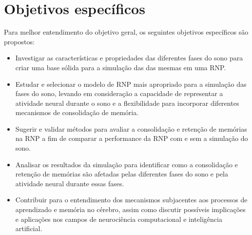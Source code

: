 \section{Objetivos específicos}

Para melhor entendimento do objetivo geral, os seguintes objetivos específicos são propostos:

\begin{itemize}

  \item Investigar as características e propriedades das diferentes fases do sono para criar uma base sólida para a simulação das
das mesmas em uma RNP.\@

  \item Estudar e selecionar o modelo de RNP mais apropriado para a simulação das fases do sono, levando em consideração a
capacidade de representar a atividade neural durante o sono e a flexibilidade para incorporar diferentes mecanismos de
consolidação de memória.

  \item Sugerir e validar métodos para avaliar a consolidação e retenção de memórias na RNP a fim de comparar a performance da
  RNP com e sem a simulação do sono.

  \item  Analisar os resultados da simulação para identificar como a consolidação e retenção de memórias são afetadas pelas
diferentes fases do sono e pela atividade neural durante essas fases.

  \item Contribuir para o entendimento dos mecanismos subjacentes aos processos de aprendizado e memória no cérebro, assim como
discutir possíveis implicações e aplicações nos campos de neurociência computacional e inteligência artificial.

\end{itemize}


